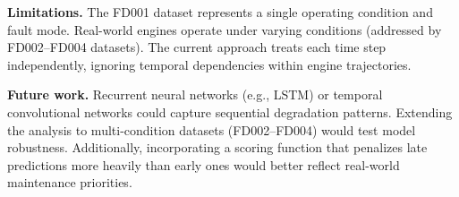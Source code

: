 \documentclass[11pt, a4paper]{article}
\begin{document}
\textbf{Limitations.} The FD001 dataset represents a single operating condition and fault mode. Real-world engines operate under varying conditions (addressed by FD002--FD004 datasets). The current approach treats each time step independently, ignoring temporal dependencies within engine trajectories.

\textbf{Future work.} Recurrent neural networks (e.g., LSTM) or temporal convolutional networks could capture sequential degradation patterns. Extending the analysis to multi-condition datasets (FD002--FD004) would test model robustness. Additionally, incorporating a scoring function that penalizes late predictions more heavily than early ones would better reflect real-world maintenance priorities.
\end{document}
